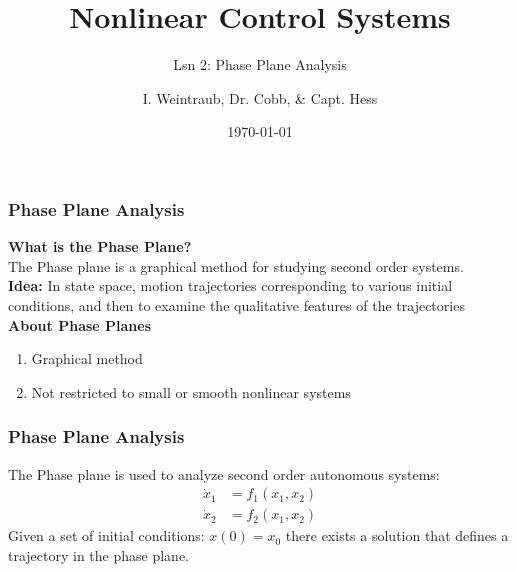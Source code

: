 \documentclass[11pt,handout]{beamer}   %
\title[Your Short Title]{Nonlinear Control Systems}
\subtitle{Lsn 2: Phase Plane Analysis}
\author{I. Weintraub, Dr. Cobb, \& Capt. Hess}
\institute{Air Force Institute of Technology}
\date{\today}
\begin{document}
\begin{frame}
  \titlepage
\end{frame}

\begin{frame}
\frametitle{Phase Plane Analysis}
\textbf{What is the Phase Plane?}\\
The Phase plane is a graphical method for studying second order systems.\\
\textbf{Idea:}
In state space, motion trajectories corresponding to various initial conditions, and then to examine the qualitative features of the trajectories\\
\textbf{About Phase Planes}\\
\begin{enumerate}
\item  Graphical method
\item Not restricted to small or smooth nonlinear systems
\end{enumerate}
\end{frame}

\begin{frame}
\frametitle{Phase Plane Analysis}
The Phase plane is used to analyze second order autonomous systems:
\begin{equation}
\begin{aligned}
\dot{x}_1 &= f_1(x_1,x_2)\\
\dot{x}_2 &= f_2(x_1,x_2)
\end{aligned}
\end{equation}
Given a set of initial conditions: $x(0)= x_0$ there exists a solution that defines a trajectory in the phase plane.
\end{frame}
\end{document}
